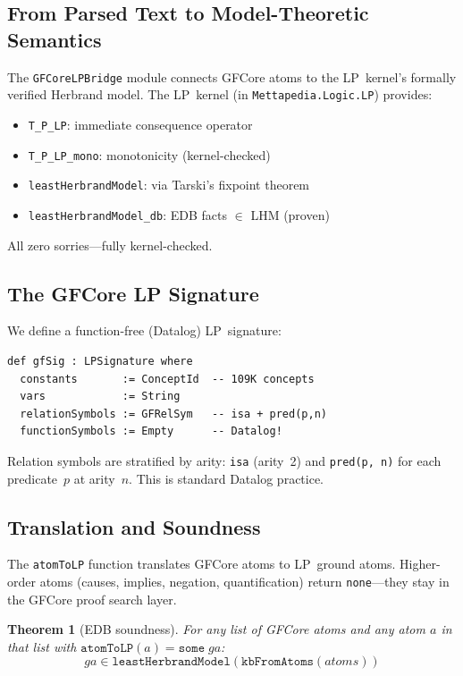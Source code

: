 \documentclass[]{article}
\newtheorem{theorem}{Theorem}
\newcommand{\code}[1]{\texttt{#1}}
\begin{document}
\subsection{From Parsed Text to Model-Theoretic Semantics}

The \code{GFCoreLPBridge} module connects GFCore atoms to the
LP~kernel's formally verified Herbrand model.  The LP~kernel
(in \code{Mettapedia.Logic.LP}) provides:

\begin{itemize}
\item \code{T\_P\_LP}: immediate consequence operator
\item \code{T\_P\_LP\_mono}: monotonicity (kernel-checked)
\item \code{leastHerbrandModel}: via Tarski's fixpoint theorem
\item \code{leastHerbrandModel\_db}: EDB facts $\in$ LHM (proven)
\end{itemize}

All zero sorries---fully kernel-checked.

\subsection{The GFCore LP Signature}

We define a function-free (Datalog) LP~signature:

\begin{lstlisting}
def gfSig : LPSignature where
  constants       := ConceptId  -- 109K concepts
  vars            := String
  relationSymbols := GFRelSym   -- isa + pred(p,n)
  functionSymbols := Empty      -- Datalog!
\end{lstlisting}

Relation symbols are stratified by arity: \code{isa} (arity~2) and
\code{pred(p, n)} for each predicate~$p$ at arity~$n$.  This is
standard Datalog practice.

\subsection{Translation and Soundness}

The \code{atomToLP} function translates GFCore atoms to LP~ground atoms.
Higher-order atoms (causes, implies, negation, quantification) return
\code{none}---they stay in the GFCore proof search layer.

\begin{theorem}[EDB soundness]
For any list of GFCore atoms and any atom $a$ in that list with
$\code{atomToLP}(a) = \texttt{some}\;ga$:
$$ga \in \code{leastHerbrandModel}(\code{kbFromAtoms}(\textit{atoms}))$$
\end{theorem}
\end{document}
